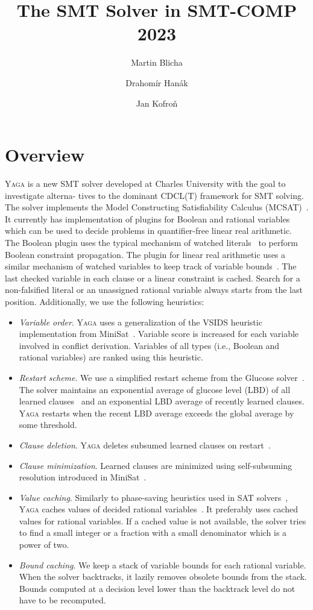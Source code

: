 \documentclass{easychair}
\title{The \yaga SMT Solver in SMT-COMP 2023}
\author{
Martin Blicha\inst{1,2} \and
Drahom{\' i}r Han{\' a}k\inst{1} \and
Jan Kofro{\v n}\inst{1}\\
}
\institute{Charles University, Prague, Czech Republic \and Universit{\`a} della Svizzera italiana, Lugano,
Switzerland}
\date{}
\newcommand{\yaga}{\textsc{Yaga}\xspace}
\begin{document}
\maketitle

\section{Overview}

\yaga is a new SMT solver developed at Charles University with the goal to investigate alterna-
tives to the dominant CDCL(T) framework for SMT solving. The solver implements the Model
Constructing Satisfiability Calculus (MCSAT)~\cite{de_moura_model-constructing_2013,jovanovic_design_2013}.
It currently has implementation of plugins for Boolean and rational variables which can be used to decide problems in quantifier-free linear real arithmetic. The Boolean plugin uses the typical mechanism of watched literals~\cite{Chaff} to perform Boolean constraint propagation. The plugin for linear real arithmetic uses a similar mechanism of watched variables to keep track of variable bounds~\cite{jovanovic_design_2013}. The last checked variable in each clause or a linear constraint is cached. Search for a non-falsified literal or an unassigned rational variable always starts from the last position. Additionally, we use the following heuristics:

\begin{itemize}
    \item \emph{Variable order}. \yaga uses a generalization of the VSIDS heuristic implementation from MiniSat~\cite{minisat}. Variable score is increased for each variable involved in conflict derivation. Variables of all types (i.e., Boolean and rational variables) are ranked using this heuristic.
    \item \emph{Restart scheme}. We use a simplified restart scheme from the Glucose solver~\cite{glucose}. The solver maintains an exponential average of glucose level (LBD) of all learned clauses~\cite{biere_2016} and an exponential LBD average of recently learned clauses. \yaga restarts when the recent LBD average exceeds the global average by some threshold.
    \item \emph{Clause deletion}. \yaga deletes subsumed learned clauses on restart~\cite{biere_2005}.
    \item \emph{Clause minimization}. Learned clauses are minimized using self-subsuming resolution introduced in MiniSat~\cite{minisat}.
    \item \emph{Value caching}. Similarly to phase-saving heuristics used in SAT solvers~\cite{darwiche_2007}, \yaga caches values of decided rational variables~\cite{jovanovic_design_2013}. It preferably uses cached values for rational variables. If a cached value is not available, the solver tries to find a small integer or a fraction with a small denominator which is a power of two.
    \item \emph{Bound caching}. We keep a stack of variable bounds for each rational variable. When the solver backtracks, it lazily removes obsolete bounds from the stack. Bounds computed at a decision level lower than the backtrack level do not have to be recomputed.
\end{itemize}
    
\end{document}
